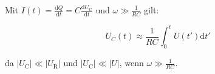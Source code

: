Mit $I(t) = \frac{\mathrm{d}Q}{\mathrm{d}t} = C \frac{\mathrm{d}U_\mathrm{C}}{\mathrm{d}t}$ und $\omega \gg \frac{1}{RC}$ gilt:

\begin{equation}
  U_C(t) \approx \frac{1}{RC} \int_0^t U(t') \mathrm{d}t'
\end{equation}

da $\left|U_{\mathrm C}\right| \ll \left|U_{\mathrm R}\right|$ und $\left|U_{\mathrm C}\right| \ll \left|U\right|$, wenn $\omega \gg \frac{1}{RC}$.
